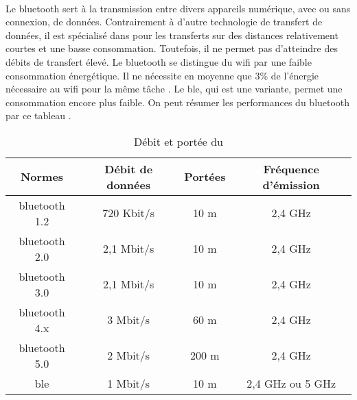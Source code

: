 \paragraph{}
\label{sec:bluetooth}

Le \gls{bluetooth} sert à la transmission entre divers appareils numérique, avec ou sans connexion,
de données. Contrairement à d'autre technologie de transfert de données, il est
spécialisé dans pour les transferts sur des distances relativement courtes et une basse
consommation. Toutefois, il ne permet pas d'atteindre des débits de transfert élevé.\newline
Le \gls{bluetooth} se distingue du \gls{wifi} par une faible consommation énergétique. Il
ne nécessite en moyenne que 3\% de l'énergie nécessaire au \gls{wifi} pour la même tâche \cite{bluetoothConsumption}.
Le \gls{ble}, qui est une variante, permet une consommation encore plus faible.\newline
On peut résumer les performances du \gls{bluetooth} par ce tableau \cite{debitPortee, ble}.

\begin{table}[ht!]
    \centering
    \begin{tabular}{|c|c|c|c|}
        \hline
        \rowcolor{tableColorDark} Normes & Débit de données & Portées & Fréquence d'émission \\
        \hline

        \gls{bluetooth} 1.2              & 720 Kbit/s       & 10 m    & 2,4 GHz              \\\hline
        \gls{bluetooth} 2.0              & 2,1 Mbit/s       & 10 m    & 2,4 GHz              \\\hline
        \gls{bluetooth} 3.0              & 2,1 Mbit/s       & 10 m    & 2,4 GHz              \\\hline
        \gls{bluetooth} 4.x              & 3 Mbit/s         & 60 m    & 2,4 GHz              \\\hline
        \gls{bluetooth} 5.0              & 2 Mbit/s         & 200 m   & 2,4 GHz              \\\hline
        \gls{ble}                        & 1 Mbit/s         & 10 m    & 2,4 GHz ou 5 GHz     \\\hline
    \end{tabular}
    \label{tab:debitPorteeBluetooth}
    \caption{Débit et portée du }
    \nocite{ble}\nocite{debitPortee}
\end{table}

